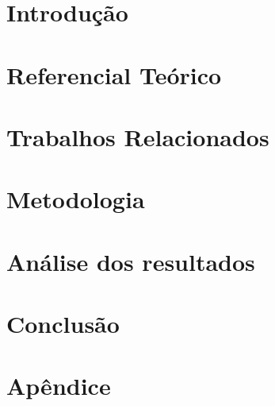 \documentclass[12pt]{article}
\begin{document}

\newpage

\section{Introdução}



\section{Referencial Teórico}



\section{Trabalhos Relacionados}



\section{Metodologia}



\section{Análise dos resultados}



\section{Conclusão}



\section*{Apêndice}






\end{document}
